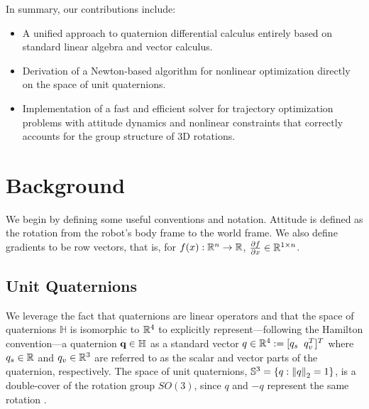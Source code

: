\documentclass[../root.tex]{subfiles}
\begin{document}
    In summary, our contributions include:

    \begin{itemize}
        \item A unified approach to quaternion differential calculus entirely based on
        standard linear algebra and vector calculus.
        \item Derivation of a Newton-based algorithm for nonlinear optimization directly
        on the space of unit quaternions.
        \item Implementation of a fast and efficient solver for trajectory optimization
        problems with attitude dynamics and nonlinear constraints that correctly accounts
        for the group structure of 3D rotations.
    \end{itemize}

\section{Background}

    We begin by defining some useful conventions and notation. 
    Attitude is defined as the rotation from the robot's body frame to the world frame.
    We also define gradients to be row vectors, that is, for 
        $f(x) : \mathbb{R}^n \to \mathbb{R}$, $\pdv{f}{x} \in \mathbb{R}^{1\times n}$.

    \subsection{Unit Quaternions} \label{sec:quaternions}
        We leverage the fact that quaternions are linear operators and that the space of
        quaternions $\mathbb{H}$ is isomorphic to $\mathbb{R}^4$ to explicitly
        represent---following the Hamilton convention---a quaternion $\textbf{q} \in \mathbb{H}$
        as a standard vector $q \in \mathbb{R}^4 := [q_s \;\; q_v^T]^T$ where $q_s \in \mathbb{R}$ and
        $q_v \in \mathbb{R}^3$ are referred to as the scalar and vector parts of the quaternion,
        respectively. The space of unit quaternions, $\mathbb{S}^3 = \{q : \norm{q}_2 = 1\}$, is a 
        double-cover of the rotation group $SO(3)$, since $q$ and $-q$ represent the same 
        rotation \cite{markley_Fundamentals_2014}.
        
\end{document}
